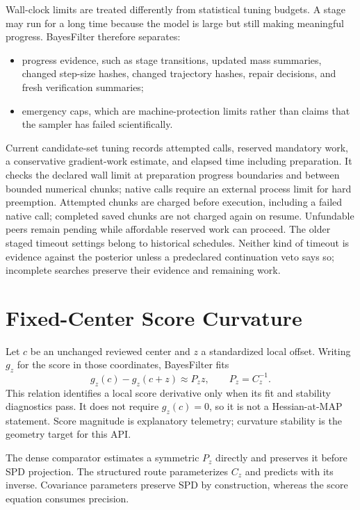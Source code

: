 Wall-clock limits are treated differently from statistical tuning budgets.  A
stage may run for a long time because the model is large but still making
meaningful progress.  BayesFilter therefore separates:

\begin{itemize}
  \item progress evidence, such as stage transitions, updated mass summaries,
    changed step-size hashes, changed trajectory hashes, repair decisions, and
    fresh verification summaries;
  \item emergency caps, which are machine-protection limits rather than claims
    that the sampler has failed scientifically.
\end{itemize}

Current candidate-set tuning records attempted calls, reserved mandatory work,
a conservative gradient-work estimate, and elapsed time including preparation.
It checks the declared wall limit at preparation progress boundaries and between
bounded numerical chunks; native calls require an external process limit for
hard preemption. Attempted chunks are charged before execution, including a
failed native call; completed saved chunks are not charged again on resume.
Unfundable peers remain pending while affordable reserved work can proceed. The older
staged timeout settings belong to historical schedules. Neither kind of timeout
is evidence against the posterior unless a predeclared continuation veto says
so; incomplete searches preserve their evidence and remaining work.

\section{Fixed-Center Score Curvature}
\label{sec:bf-fixed-center-score-curvature}

Let $c$ be an unchanged reviewed center and $z$ a standardized local offset.
Writing $g_z$ for the score in those coordinates, BayesFilter fits
\begin{equation}
  g_z(c)-g_z(c+z) \approx P_z z,
  \qquad P_z=C_z^{-1}.
  \label{eq:bf-fixed-center-score-curvature}
\end{equation}
This relation identifies a local score derivative only when its fit and
stability diagnostics pass.  It does not require $g_z(c)=0$, so it is not a
Hessian-at-MAP statement.  Score magnitude is explanatory telemetry;
curvature stability is the geometry target for this API.

The dense comparator estimates a symmetric $P_z$ directly and preserves it
before SPD projection.  The structured route parameterizes $C_z$ and predicts
with its inverse.  Covariance parameters preserve SPD by construction, whereas
the score equation consumes precision.

